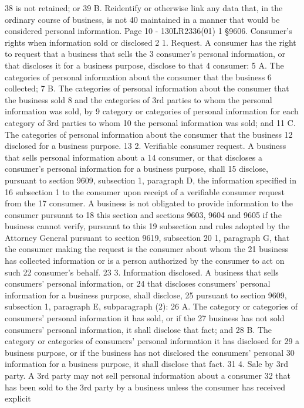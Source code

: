 38 is not retained; or
39 B. Reidentify or otherwise link any data that, in the ordinary course of business, is not
40 maintained in a manner that would be considered personal information.
Page 10 - 130LR2336(01)
1 §9606. Consumer's rights when information sold or disclosed
2 1. Request. A consumer has the right to request that a business that sells the
3 consumer's personal information, or that discloses it for a business purpose, disclose to that
4 consumer:
5 A. The categories of personal information about the consumer that the business
6 collected;
7 B. The categories of personal information about the consumer that the business sold
8 and the categories of 3rd parties to whom the personal information was sold, by
9 category or categories of personal information for each category of 3rd parties to whom
10 the personal information was sold; and
11 C. The categories of personal information about the consumer that the business
12 disclosed for a business purpose.
13 2. Verifiable consumer request. A business that sells personal information about a
14 consumer, or that discloses a consumer's personal information for a business purpose, shall
15 disclose, pursuant to section 9609, subsection 1, paragraph D, the information specified in
16 subsection 1 to the consumer upon receipt of a verifiable consumer request from the
17 consumer. A business is not obligated to provide information to the consumer pursuant to
18 this section and sections 9603, 9604 and 9605 if the business cannot verify, pursuant to this
19 subsection and rules adopted by the Attorney General pursuant to section 9619, subsection
20 1, paragraph G, that the consumer making the request is the consumer about whom the
21 business has collected information or is a person authorized by the consumer to act on such
22 consumer's behalf.
23 3. Information disclosed. A business that sells consumers' personal information, or
24 that discloses consumers' personal information for a business purpose, shall disclose,
25 pursuant to section 9609, subsection 1, paragraph E, subparagraph (2):
26 A. The category or categories of consumers' personal information it has sold, or if the
27 business has not sold consumers' personal information, it shall disclose that fact; and
28 B. The category or categories of consumers' personal information it has disclosed for
29 a business purpose, or if the business has not disclosed the consumers' personal
30 information for a business purpose, it shall disclose that fact.
31 4. Sale by 3rd party. A 3rd party may not sell personal information about a consumer
32 that has been sold to the 3rd party by a business unless the consumer has received explicit
